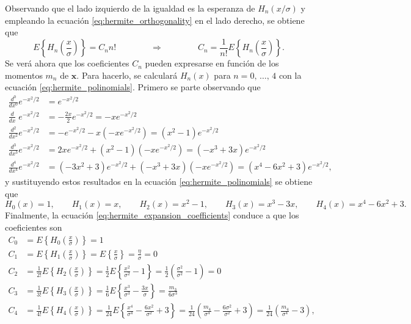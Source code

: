 \documentclass[a4paper]{report}
\newcommand{\x}{\mathbf{x}}
\begin{document}
Observando que el lado izquierdo de la igualdad es la esperanza de \(H_n(x/\sigma)\) y empleando la ecuación \ref{eq:hermite_orthogonality} en el lado derecho, se obtiene que 
\begin{equation}\label{eq:hermite_expansion_coefficients}
 E\left\{H_n\left(\frac{x}{\sigma}\right)\right\}=C_nn!
\qquad\qquad\Rightarrow\qquad\qquad
 C_n=\frac{1}{n!}E\left\{H_n\left(\frac{x}{\sigma}\right)\right\}.
\end{equation}
Se verá ahora que los coeficientes \(C_n\) pueden expresarse en función de los momentos \(m_n\) de \(\x\). Para hacerlo, se calculará \(H_n(x)\) para \(n=0,\,\dots,\,4\) con la ecuación \ref{eq:hermite_polinomials}. Primero se parte observando que
\begin{align*}
 \frac{d^0}{dx^0}e^{-x^2/2}&=e^{-x^2/2}\\
 \frac{d}{dx}\;e^{-x^2/2}&=-\frac{2x}{2}e^{-x^2/2}=-xe^{-x^2/2}\\
 \frac{d^2}{dx^2}e^{-x^2/2}&=-e^{-x^2/2}-x(-xe^{-x^2/2})=(x^2-1)e^{-x^2/2}\\
 \frac{d^3}{dx^3}e^{-x^2/2}&=2xe^{-x^2/2}+(x^2-1)(-xe^{-x^2/2})=(-x^3+3x)e^{-x^2/2}\\
 \frac{d^4}{dx^4}e^{-x^2/2}&=(-3x^2+3)e^{-x^2/2}+(-x^3+3x)(-xe^{-x^2/2})=(x^4-6x^2+3)e^{-x^2/2},
\end{align*}
y sustituyendo estos resultados en la ecuación \ref{eq:hermite_polinomials} se obtiene que 
\[
 H_0(x)=1,\qquad H_1(x)=x,\qquad H_2(x)=x^2-1,\qquad H_3(x)=x^3-3x,\qquad H_4(x)=x^4-6x^2+3.
\]
Finalmente, la ecuación \ref{eq:hermite_expansion_coefficients} conduce a que los coeficientes son
\begin{align*}
 C_0&=E\left\{H_0\left(\frac{x}{\sigma}\right)\right\}=1\\
 C_1&=E\left\{H_1\left(\frac{x}{\sigma}\right)\right\}=E\left\{\frac{x}{\sigma}\right\}=\frac{\eta}{\sigma}=0\\
 C_2&=\frac{1}{2!}E\left\{H_2\left(\frac{x}{\sigma}\right)\right\}=\frac{1}{2}E\left\{\frac{x^2}{\sigma^2}-1\right\}=\frac{1}{2}\left(\frac{\sigma^2}{\sigma^2}-1\right)=0\\
 C_3&=\frac{1}{3!}E\left\{H_3\left(\frac{x}{\sigma}\right)\right\}=\frac{1}{6}E\left\{\frac{x^3}{\sigma^3}-\frac{3x}{\sigma}\right\}=\frac{m_3}{6\sigma^3}\\
 C_4&=\frac{1}{4!}E\left\{H_4\left(\frac{x}{\sigma}\right)\right\}=\frac{1}{24}E\left\{\frac{x^4}{\sigma^4}-\frac{6x^2}{\sigma^2}+3\right\}=\frac{1}{24}\left(\frac{m_4}{\sigma^4}-\frac{6\sigma^2}{\sigma^2}+3\right)=\frac{1}{24}\left(\frac{m_4}{\sigma^4}-3\right),
\end{align*}
\end{document}
